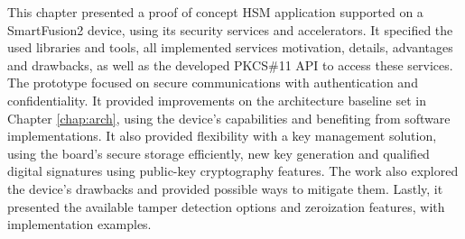 This chapter presented a proof of concept HSM application supported on a SmartFusion2 device, using its security services and accelerators. It specified the used libraries and tools, all implemented services motivation, details, advantages and drawbacks, as well as the developed PKCS\#11 API to access these services. The prototype focused on secure communications with authentication and confidentiality. It provided improvements on the architecture baseline set in Chapter \ref{chap:arch}, using the device's capabilities and benefiting from software implementations. It also provided flexibility with a key management solution, using the board's secure storage efficiently, new key generation and qualified digital signatures using public-key cryptography features.
The work also explored the device's drawbacks and provided possible ways to mitigate them. Lastly, it presented the available tamper detection options and zeroization features, with implementation examples.
